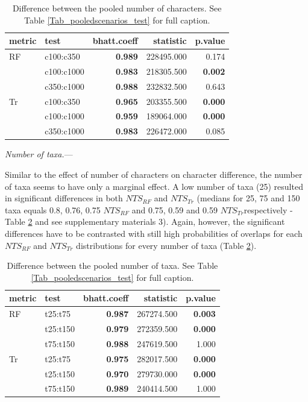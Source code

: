 \documentclass[12pt,letterpaper]{article}
\renewcommand{\subsubsection}[1]{%
\vspace{2ex}
\noindent
\textit{#1.}---}
\begin{document}
\begin{table}[ht]
\centering
\begin{tabular}{ll|r|rr}
  \hline
metric & test & bhatt.coeff & statistic & p.value \\ 
  \hline
RF & c100:c350 & \textbf{0.989} & 228495.000 & 0.174 \\ 
   & c100:c1000 & \textbf{0.983} & 218305.500 & \textbf{0.002} \\ 
   & c350:c1000 & \textbf{0.988} & 232832.500 & 0.643 \\ 
  Tr & c100:c350 & \textbf{0.965} & 203355.500 & \textbf{0.000} \\ 
   & c100:c1000 & \textbf{0.959} & 189064.000 & \textbf{0.000} \\ 
   & c350:c1000 & \textbf{0.983} & 226472.000 & 0.085 \\ 
   \hline
\end{tabular}
\caption{Difference between the pooled number of characters. See Table \ref{Tab_pooledscenarios_test} for full caption.} 
\label{Tab_pooledscharacters_test}
\end{table}

\subsubsection{Number of taxa}

Similar to the effect of number of characters on character difference, the number of taxa seems to have only a marginal effect.
A low number of taxa (25) resulted in significant differences in both $NTS_{RF}$ and $NTS_{Tr}$ (medians for 25, 75 and 150 taxa equals 0.8, 0.76, 0.75 $NTS_{RF}$ and 0.75, 0.59 and 0.59 $NTS_{Tr}$respectively - Table \ref{Tab_pooledstaxa_test} and see supplementary materials 3).
Again, however, the significant differences have to be contrasted with still high probabilities of overlaps for each $NTS_{RF}$ and $NTS_{Tr}$ distributions for every number of taxa (Table \ref{Tab_pooledstaxa_test}).

\begin{table}[ht]
\centering
\begin{tabular}{ll|r|rr}
  \hline
metric & test & bhatt.coeff & statistic & p.value \\ 
  \hline
RF & t25:t75 & \textbf{0.987} & 267274.500 & \textbf{0.003} \\ 
   & t25:t150 &\textbf{0.979} & 272359.500 & \textbf{0.000} \\ 
   & t75:t150 & \textbf{0.988} & 247619.500 & 1.000 \\ 
Tr & t25:t75 & \textbf{0.975} & 282017.500 & \textbf{0.000} \\ 
   & t25:t150 & \textbf{0.970} & 279730.000 & \textbf{0.000} \\ 
   & t75:t150 & \textbf{0.989} & 240414.500 & 1.000 \\ 
   \hline
\end{tabular}
\caption{Difference between the pooled number of taxa. See Table \ref{Tab_pooledscenarios_test} for full caption.} 
\label{Tab_pooledstaxa_test}
\end{table}
\end{document}
